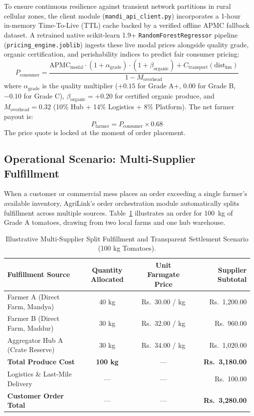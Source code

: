 To ensure continuous resilience against transient network partitions in rural cellular zones, the client module (\texttt{mandi\_api\_client.py}) incorporates a 1-hour in-memory Time-To-Live (TTL) cache backed by a verified offline APMC fallback dataset. A retrained native scikit-learn 1.9+ \texttt{RandomForestRegressor} pipeline (\texttt{pricing\_engine.joblib}) ingests these live modal prices alongside quality grade, organic certification, and perishability indices to predict fair consumer pricing:
\begin{equation}
\label{eqn:fair_pricing}
P_{\text{consumer}} = \frac{\text{APMC}_{\text{modal}} \cdot (1 + \alpha_{\text{grade}}) \cdot (1 + \beta_{\text{organic}}) + C_{\text{transport}}(\text{dist}_{\text{km}})}{1 - M_{\text{overhead}}}
\end{equation}
where $\alpha_{\text{grade}}$ is the quality multiplier ($+0.15$ for Grade A+, $0.00$ for Grade B, $-0.10$ for Grade C), $\beta_{\text{organic}} = +0.20$ for certified organic produce, and $M_{\text{overhead}} = 0.32$ (10\% Hub + 14\% Logistics + 8\% Platform). The net farmer payout is:
\begin{equation}
\label{eqn:farmer_payout}
P_{\text{farmer}} = P_{\text{consumer}} \times 0.68
\end{equation}
The price quote is locked at the moment of order placement.

\subsection{Operational Scenario: Multi-Supplier Fulfillment}
When a customer or commercial mess places an order exceeding a single farmer's available inventory, AgriLink's order orchestration module automatically splits fulfillment across multiple sources. Table~\ref{tab:split_scenario} illustrates an order for 100~kg of Grade A tomatoes, drawing from two local farms and one hub warehouse.

\begin{table}[htbp]
\centering
\caption{Illustrative Multi-Supplier Split Fulfillment and Transparent Settlement Scenario (100 kg Tomatoes).}
\label{tab:split_scenario}
\begin{tabular}{|l|c|c|r|}
\hline
\textbf{Fulfillment Source} & \textbf{Quantity Allocated} & \textbf{Unit Farmgate Price} & \textbf{Supplier Subtotal} \\ \hline
Farmer A (Direct Farm, Mandya) & 40 kg & Rs.~30.00 / kg & Rs.~1,200.00 \\ \hline
Farmer B (Direct Farm, Maddur) & 30 kg & Rs.~32.00 / kg & Rs.~960.00 \\ \hline
Aggregator Hub A (Crate Reserve) & 30 kg & Rs.~34.00 / kg & Rs.~1,020.00 \\ \hline
\textbf{Total Produce Cost} & \textbf{100 kg} & --- & \textbf{Rs.~3,180.00} \\ \hline
Logistics \& Last-Mile Delivery & --- & --- & Rs.~100.00 \\ \hline
\textbf{Customer Order Total} & --- & --- & \textbf{Rs.~3,280.00} \\ \hline
\end{tabular}
\end{table}

